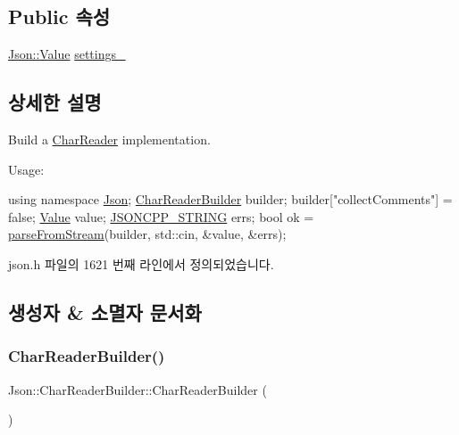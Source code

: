 \subsection*{Public 속성}
\begin{DoxyCompactItemize}
\item 
\hyperlink{class_json_1_1_value}{Json\+::\+Value} \hyperlink{class_json_1_1_char_reader_builder_ac69b7911ad64c171c51ebaf2ea26d958}{settings\+\_\+}
\end{DoxyCompactItemize}


\subsection{상세한 설명}
Build a \hyperlink{class_json_1_1_char_reader}{Char\+Reader} implementation. 

Usage\+: 
\begin{DoxyCode}
\textcolor{keyword}{using namespace }\hyperlink{namespace_json}{Json};
\hyperlink{class_json_1_1_char_reader_builder}{CharReaderBuilder} builder;
builder[\textcolor{stringliteral}{"collectComments"}] = \textcolor{keyword}{false};
\hyperlink{class_json_1_1_value}{Value} value;
\hyperlink{json-forwards_8h_a1e723f95759de062585bc4a8fd3fa4be}{JSONCPP\_STRING} errs;
\textcolor{keywordtype}{bool} ok = \hyperlink{namespace_json_aab0cf1ecf81d1aeca12be2a416a84352}{parseFromStream}(builder, std::cin, &value, &errs);
\end{DoxyCode}
 

json.\+h 파일의 1621 번째 라인에서 정의되었습니다.



\subsection{생성자 \& 소멸자 문서화}
\mbox{\label{class_json_1_1_char_reader_builder_a6e197b69a2ede3d87b03b9c5c78ba46a}} 
\subsubsection{\texorpdfstring{Char\+Reader\+Builder()}{CharReaderBuilder()}}
{\footnotesize\ttfamily Json\+::\+Char\+Reader\+Builder\+::\+Char\+Reader\+Builder (\begin{DoxyParamCaption}{ }\end{DoxyParamCaption})}



